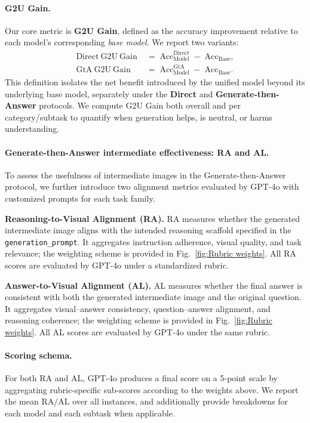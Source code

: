 \documentclass{article}
\theoremstyle{plain}
\theoremstyle{definition}
\theoremstyle{remark}
\begin{document}
\paragraph{G2U Gain.}
Our core metric is \textbf{G2U Gain}, defined as the accuracy improvement relative to each model's corresponding \emph{base model}. We report two variants:
\begin{align}
\mathrm{Direct\ G2U\ Gain} \;&=\; \mathrm{Acc}^{\text{Direct}}_{\text{Model}} \; -\; \mathrm{Acc}_{\text{Base}}, \label{eq:direct_g2u_gain}\\
\mathrm{GtA \ G2U\ Gain} \;&=\; \mathrm{Acc}^{\text{GtA}}_{\text{Model}} \; -\; \mathrm{Acc}_{\text{Base}}. \label{eq:stepwise_g2u_gain}
\end{align}
This definition isolates the net benefit introduced by the unified model beyond its underlying base model, separately under the \textbf{Direct} and \textbf{Generate-then-Answer } protocols. We compute G2U Gain both overall and per category/subtask to quantify when generation helps, is neutral, or harms understanding.

\paragraph{Generate-then-Answer  intermediate effectiveness: RA and AL.}
To assess the usefulness of intermediate images in the Generate-then-Answer  protocol, we further introduce two alignment metrics evaluated by GPT-4o with customized prompts for each task family.

\textbf{Reasoning-to-Visual Alignment (RA).}
RA measures whether the generated intermediate image aligns with the intended reasoning scaffold specified in the \texttt{generation\_prompt}. It aggregates instruction adherence, visual quality, and task relevance; the weighting scheme is provided in Fig.~\ref{fig:Rubric weights}. All RA scores are evaluated by GPT-4o under a standardized rubric.

\textbf{Answer-to-Visual Alignment (AL).}
AL measures whether the final answer is consistent with both the generated intermediate image and the original question. It aggregates visual--answer consistency, question--answer alignment, and reasoning coherence; the weighting scheme is provided in Fig.~\ref{fig:Rubric weights}. All AL scores are evaluated by GPT-4o under the same rubric.

\paragraph{Scoring schema.}
For both RA and AL, GPT-4o produces a final score on a 5-point scale by aggregating rubric-specific sub-scores according to the weights above. We report the mean RA/AL over all instances, and additionally provide breakdowns for each model and each subtask when applicable.
\end{document}
